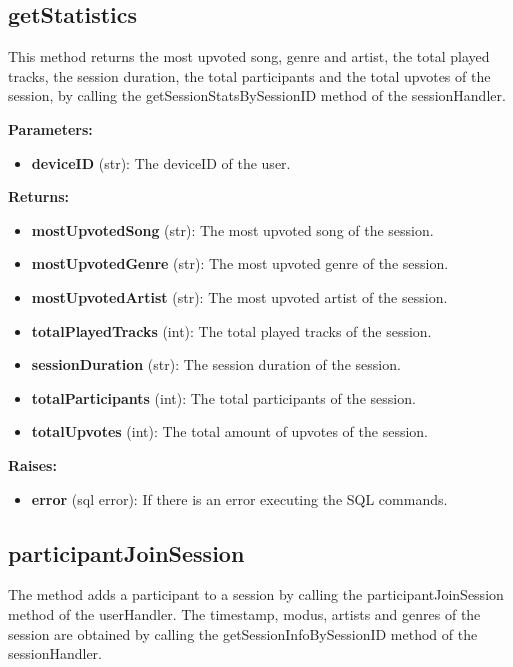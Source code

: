 \documentclass[oneside, nenglish]{sdqtechreport}
\begin{document}
\begin{itemize}
\subsection{getStatistics}

This method returns the most upvoted song, genre and artist, the total played tracks, the session duration, the total participants and the total upvotes of the session, by calling the getSessionStatsBySessionID method of the sessionHandler.

\textbf{Parameters:}

\begin{itemize}
    \item \textbf{deviceID} (str): The deviceID of the user.
\end{itemize}

\textbf{Returns:}

\begin{itemize}
    \item \textbf{mostUpvotedSong} (str): The most upvoted song of the session.
    \item \textbf{mostUpvotedGenre} (str): The most upvoted genre of the session.
    \item \textbf{mostUpvotedArtist} (str): The most upvoted artist of the session.
    \item \textbf{totalPlayedTracks} (int): The total played tracks of the session.
    \item \textbf{sessionDuration} (str): The session duration of the session.
    \item \textbf{totalParticipants} (int): The total participants of the session.
    \item \textbf{totalUpvotes} (int): The total amount of upvotes of the session.
\end{itemize}

\textbf{Raises:}

\begin{itemize}
    \item \textbf{error} (sql error): If there is an error executing the SQL commands.
\end{itemize}


\subsection{participantJoinSession}

The method adds a participant to a session by calling the participantJoinSession method of the userHandler. The timestamp, modus, artists and genres of the session are obtained by calling the getSessionInfoBySessionID method of the sessionHandler.


\end{itemize}
\end{document}
